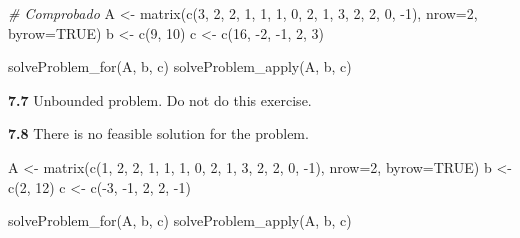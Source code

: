 \documentclass[
]{article}
\newenvironment{Shaded}{\begin{snugshade}}{\end{snugshade}}
\newcommand{\AttributeTok}[1]{\textcolor[rgb]{0.77,0.63,0.00}{#1}}
\newcommand{\CommentTok}[1]{\textcolor[rgb]{0.56,0.35,0.01}{\textit{#1}}}
\newcommand{\ConstantTok}[1]{\textcolor[rgb]{0.00,0.00,0.00}{#1}}
\newcommand{\DecValTok}[1]{\textcolor[rgb]{0.00,0.00,0.81}{#1}}
\newcommand{\FunctionTok}[1]{\textcolor[rgb]{0.00,0.00,0.00}{#1}}
\newcommand{\NormalTok}[1]{#1}
\newcommand{\OtherTok}[1]{\textcolor[rgb]{0.56,0.35,0.01}{#1}}
\newcommand{\SpecialCharTok}[1]{\textcolor[rgb]{0.00,0.00,0.00}{#1}}
\begin{document}
\begin{Shaded}
\begin{Highlighting}[]
\CommentTok{\# Comprobado}
\NormalTok{A }\OtherTok{\textless{}{-}} \FunctionTok{matrix}\NormalTok{(}\FunctionTok{c}\NormalTok{(}\DecValTok{3}\NormalTok{, }\DecValTok{2}\NormalTok{, }\DecValTok{2}\NormalTok{, }\DecValTok{1}\NormalTok{, }\DecValTok{1}\NormalTok{, }\DecValTok{1}\NormalTok{, }\DecValTok{0}\NormalTok{, }\DecValTok{2}\NormalTok{, }\DecValTok{1}\NormalTok{, }\DecValTok{3}\NormalTok{, }\DecValTok{2}\NormalTok{, }\DecValTok{2}\NormalTok{, }\DecValTok{0}\NormalTok{, }\SpecialCharTok{{-}}\DecValTok{1}\NormalTok{), }\AttributeTok{nrow=}\DecValTok{2}\NormalTok{, }\AttributeTok{byrow=}\ConstantTok{TRUE}\NormalTok{)}
\NormalTok{b }\OtherTok{\textless{}{-}} \FunctionTok{c}\NormalTok{(}\DecValTok{9}\NormalTok{, }\DecValTok{10}\NormalTok{)}
\NormalTok{c }\OtherTok{\textless{}{-}} \FunctionTok{c}\NormalTok{(}\DecValTok{16}\NormalTok{, }\SpecialCharTok{{-}}\DecValTok{2}\NormalTok{, }\SpecialCharTok{{-}}\DecValTok{1}\NormalTok{, }\DecValTok{2}\NormalTok{, }\DecValTok{3}\NormalTok{)}

\FunctionTok{solveProblem\_for}\NormalTok{(A, b, c)}
\FunctionTok{solveProblem\_apply}\NormalTok{(A, b, c)}
\end{Highlighting}
\end{Shaded}

\textbf{7.7} Unbounded problem. Do not do this exercise.

\textbf{7.8} There is no feasible solution for the problem.

\begin{Shaded}
\begin{Highlighting}[]
\NormalTok{A }\OtherTok{\textless{}{-}} \FunctionTok{matrix}\NormalTok{(}\FunctionTok{c}\NormalTok{(}\DecValTok{1}\NormalTok{, }\DecValTok{2}\NormalTok{, }\DecValTok{2}\NormalTok{, }\DecValTok{1}\NormalTok{, }\DecValTok{1}\NormalTok{, }\DecValTok{1}\NormalTok{, }\DecValTok{0}\NormalTok{, }\DecValTok{2}\NormalTok{, }\DecValTok{1}\NormalTok{, }\DecValTok{3}\NormalTok{, }\DecValTok{2}\NormalTok{, }\DecValTok{2}\NormalTok{, }\DecValTok{0}\NormalTok{, }\SpecialCharTok{{-}}\DecValTok{1}\NormalTok{), }\AttributeTok{nrow=}\DecValTok{2}\NormalTok{, }\AttributeTok{byrow=}\ConstantTok{TRUE}\NormalTok{)}
\NormalTok{b }\OtherTok{\textless{}{-}} \FunctionTok{c}\NormalTok{(}\DecValTok{2}\NormalTok{, }\DecValTok{12}\NormalTok{)}
\NormalTok{c }\OtherTok{\textless{}{-}} \FunctionTok{c}\NormalTok{(}\SpecialCharTok{{-}}\DecValTok{3}\NormalTok{, }\SpecialCharTok{{-}}\DecValTok{1}\NormalTok{, }\DecValTok{2}\NormalTok{, }\DecValTok{2}\NormalTok{, }\SpecialCharTok{{-}}\DecValTok{1}\NormalTok{)}

\FunctionTok{solveProblem\_for}\NormalTok{(A, b, c)}
\FunctionTok{solveProblem\_apply}\NormalTok{(A, b, c)}
\end{Highlighting}
\end{Shaded}
\end{document}
